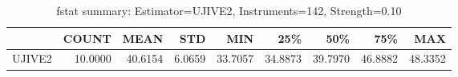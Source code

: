 \begin{table}[ht]
\centering
\caption{fstat summary: Estimator=UJIVE2, Instruments=142, Strength=0.10}
\begin{tabular}{lrrrrrrrr}
\toprule
 & COUNT & MEAN & STD & MIN & 25\% & 50\% & 75\% & MAX \\
\midrule
UJIVE2 & 10.0000 & 40.6154 & 6.0659 & 33.7057 & 34.8873 & 39.7970 & 46.8882 & 48.3352 \\
\bottomrule
\end{tabular}
\end{table}
